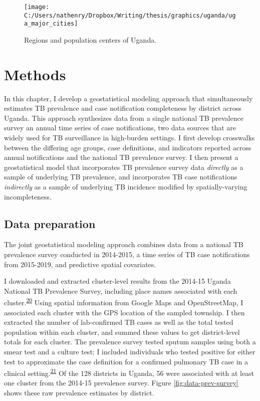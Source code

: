 \documentclass[
]{article}
\begin{document}
\begin{figure}[!ht]

{\centering \texttt{[image: C:/Users/nathenry/Dropbox/Writing/thesis/graphics/uganda/uga\_major\_cities]} 

}

\caption{Regions and population centers of Uganda.}\label{fig:uga-map}
\end{figure}

\hypertarget{methods}{%
\section{Methods}\label{methods}}

In this chapter, I develop a geostatistical modeling approach that simultaneously estimates TB prevalence and case notification completeness by district across Uganda. This approach synthesizes data from a single national TB prevalence survey an annual time series of case notifications, two data sources that are widely used for TB surveillance in high-burden settings. I first develop crosswalks between the differing age groups, case definitions, and indicators reported across annual notifications and the national TB prevalence survey. I then present a geostatistical model that incorporates TB prevalence survey data \emph{directly} as a sample of underlying TB prevalence, and incorporates TB case notifications \emph{indirectly} as a sample of underlying TB incidence modified by spatially-varying incompleteness.

\hypertarget{data-preparation}{%
\subsection{Data preparation}\label{data-preparation}}

The joint geostatistical modeling approach combines data from a national TB prevalence survey conducted in 2014-2015, a time series of TB case notifications from 2015-2019, and predictive spatial covariates.

I downloaded and extracted cluster-level results from the 2014-15 Uganda National TB Prevalence Survey, including place names associated with each cluster.\textsuperscript{\protect\hyperlink{ref-UgandaMinistryofHealth2015}{20}} Using spatial information from Google Maps and OpenStreetMap, I associated each cluster with the GPS location of the sampled township. I then extracted the number of lab-confirmed TB cases as well as the total tested population within each cluster, and summed these values to get district-level totals for each cluster. The prevalence survey tested sputum samples using both a smear test and a culture test; I included individuals who tested positive for either test to approximate the case definition for a confirmed pulmonary TB case in a clinical setting.\textsuperscript{\protect\hyperlink{ref-UgandaNationalTuberculosisandLeprosyProgramme2017}{21}} Of the 128 districts in Uganda, 56 were associated with at least one cluster from the 2014-15 prevalence survey. Figure \ref{fig:data-prev-survey} shows these raw prevalence estimates by district.
\end{document}
